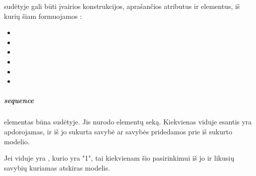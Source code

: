 \documentclass[letterpaper,10pt,lithuanian]{sphinxmanual}
\begin{document}
\sphinxAtStartPar
{} sudėtyje gali būti įvairios konstrukcijos, aprašančios atributus ir elementus, iš kurių šiam
{\hyperref[\detokenize{formatas:model}]{}} formuojamos {\hyperref[\detokenize{formatas:property}]{}}:
\begin{itemize}
\item {} 
\sphinxAtStartPar
{}

\item {} 
\sphinxAtStartPar
{}

\item {} 
\sphinxAtStartPar
{}

\item {} 
\sphinxAtStartPar
{}

\item {} 
\sphinxAtStartPar
{}

\item {} 
\sphinxAtStartPar
{}

\end{itemize}


\subparagraph{sequence}
\label{\detokenize{schemos/xsd:sequence}}\label{\detokenize{schemos/xsd:xsd-sequence}}
\sphinxAtStartPar
{} elementas būna  sudėtyje. Jis nurodo  elementų seką.
Kiekvienas  viduje esantis  yra apdorojamas, ir iš jo sukurta savybė ar savybės
pridedamos prie iš  sukurto modelio.

\sphinxAtStartPar
Jei  viduje yra {\hyperref[\detokenize{schemos/xsd:xsd-choice}]{}}, kurio {\hyperref[\detokenize{schemos/xsd:xsd-maxoccurs}]{}} yra "1", tai kiekvienam šio
{\hyperref[\detokenize{schemos/xsd:xsd-choice}]{}} pasirinkimui iš jo ir likusių savybių kuriamas atskiras modelis.
\end{document}
